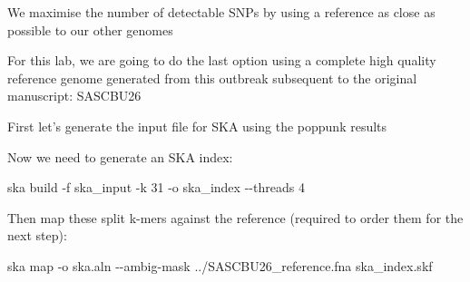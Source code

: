 \documentclass[
]{book}
\newenvironment{Shaded}{\begin{snugshade}}{\end{snugshade}}
\newcommand{\AttributeTok}[1]{\textcolor[rgb]{0.13,0.29,0.53}{#1}}
\newcommand{\BuiltInTok}[1]{#1}
\newcommand{\ExtensionTok}[1]{#1}
\newcommand{\FunctionTok}[1]{\textcolor[rgb]{0.13,0.29,0.53}{\textbf{#1}}}
\newcommand{\KeywordTok}[1]{\textcolor[rgb]{0.13,0.29,0.53}{\textbf{#1}}}
\newcommand{\NormalTok}[1]{#1}
\newcommand{\OperatorTok}[1]{\textcolor[rgb]{0.81,0.36,0.00}{\textbf{#1}}}
\newcommand{\StringTok}[1]{\textcolor[rgb]{0.31,0.60,0.02}{#1}}
\begin{document}
We maximise the number of detectable SNPs by using a reference as close as possible to our other genomes

For this lab, we are going to do the last option using a complete high quality reference genome generated from this outbreak subsequent to the original manuscript: SASCBU26

First let's generate the input file for SKA using the poppunk results

\begin{Shaded}
\end{Shaded}

Now we need to generate an SKA index:

\begin{Shaded}
\begin{Highlighting}[]
\ExtensionTok{ska}\NormalTok{ build }\AttributeTok{{-}f}\NormalTok{ ska\_input }\AttributeTok{{-}k}\NormalTok{ 31 }\AttributeTok{{-}o}\NormalTok{ ska\_index }\AttributeTok{{-}{-}threads}\NormalTok{ 4}
\end{Highlighting}
\end{Shaded}

Then map these split k-mers against the reference (required to order them for the next step):

\begin{Shaded}
\begin{Highlighting}[]
\ExtensionTok{ska}\NormalTok{ map }\AttributeTok{{-}o}\NormalTok{ ska.aln }\AttributeTok{{-}{-}ambig{-}mask}\NormalTok{ ../SASCBU26\_reference.fna ska\_index.skf}
\end{Highlighting}
\end{Shaded}
\end{document}
